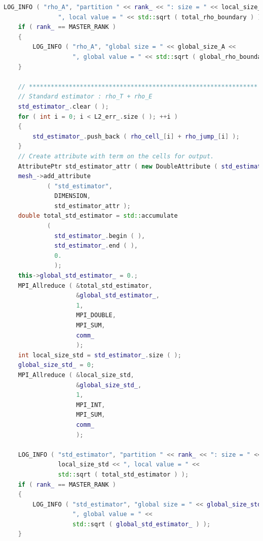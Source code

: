 \documentclass[a4paper, 11pt, twoside]{article}
\begin{document}
\begin{lstlisting}[language=C++, basicstyle={\footnotesize, \ttfamily}, keywordstyle=\color{blue}, numbers=none, tabsize=4]
    LOG_INFO ( "rho_A", "partition " << rank_ << ": size = " << local_size_A << 
               ", local value = " << std::sqrt ( total_rho_boundary ) );
    if ( rank_ == MASTER_RANK )
    {
        LOG_INFO ( "rho_A", "global size = " << global_size_A <<
                   ", global value = " << std::sqrt ( global_rho_boundary ) );
    }

    // ***************************************************************
    // Standard estimator : rho_T + rho_E
    std_estimator_.clear ( );
    for ( int i = 0; i < L2_err_.size ( ); ++i )
    {
        std_estimator_.push_back ( rho_cell_[i] + rho_jump_[i] );
    }
    // Create attribute with term on the cells for output.
    AttributePtr std_estimator_attr ( new DoubleAttribute ( std_estimator_ ) );
    mesh_->add_attribute
            ( "std_estimator",
              DIMENSION,
              std_estimator_attr );
    double total_std_estimator = std::accumulate
            (
              std_estimator_.begin ( ),
              std_estimator_.end ( ),
              0.
              );
    this->global_std_estimator_ = 0.;
    MPI_Allreduce ( &total_std_estimator,
                    &global_std_estimator_,
                    1,
                    MPI_DOUBLE,
                    MPI_SUM,
                    comm_
                    );
    int local_size_std = std_estimator_.size ( );
    global_size_std_ = 0;
    MPI_Allreduce ( &local_size_std,
                    &global_size_std_,
                    1,
                    MPI_INT,
                    MPI_SUM,
                    comm_
                    );

    LOG_INFO ( "std_estimator", "partition " << rank_ << ": size = " <<
               local_size_std << ", local value = " << 
               std::sqrt ( total_std_estimator ) );
    if ( rank_ == MASTER_RANK )
    {
        LOG_INFO ( "std_estimator", "global size = " << global_size_std_ << 
                   ", global value = " << 
                   std::sqrt ( global_std_estimator_ ) );
    }


\end{lstlisting}
\end{document}
